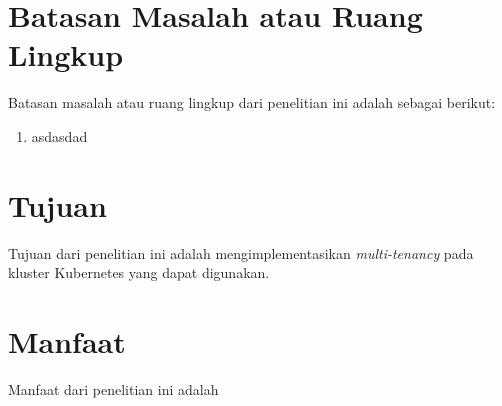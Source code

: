 \section{Batasan Masalah atau Ruang Lingkup}

Batasan masalah atau ruang lingkup dari penelitian ini adalah sebagai berikut:
\begin{enumerate}
  \vspace{-0.3cm}\item{asdasdad}
\end{enumerate}

\section{Tujuan}

Tujuan dari penelitian ini adalah mengimplementasikan \emph{multi-tenancy}
pada kluster Kubernetes yang dapat digunakan.

\section{Manfaat}

Manfaat dari penelitian ini adalah 

